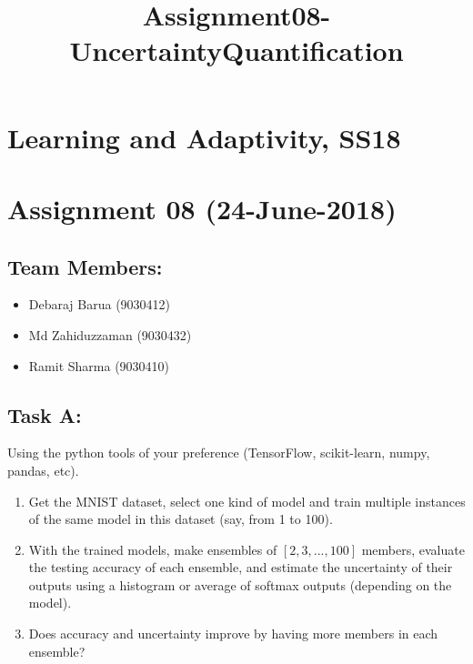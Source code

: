 \documentclass[11pt]{article}
\title{Assignment08-UncertaintyQuantification}
\providecommand{\tightlist}{%
      \setlength{\itemsep}{0pt}\setlength{\parskip}{0pt}}
\begin{document}
    
    
    \maketitle
    
    

    
    \section{Learning and Adaptivity,
SS18}\label{learning-and-adaptivity-ss18}

\section{Assignment 08 (24-June-2018)}\label{assignment-08-24-june-2018}

\subsection{Team Members:}\label{team-members}

\begin{itemize}
\tightlist
\item
  Debaraj Barua (9030412)
\item
  Md Zahiduzzaman (9030432)
\item
  Ramit Sharma (9030410)
\end{itemize}

    \subsection{Task A:}\label{task-a}

Using the python tools of your preference (TensorFlow, scikit-learn,
numpy, pandas, etc).

\begin{enumerate}
\def\labelenumi{\arabic{enumi}.}
\item
  Get the MNIST dataset, select one kind of model and train multiple
  instances of the same model in this dataset (say, from 1 to 100).
\item
  With the trained models, make ensembles of \([2, 3, ..., 100]\)
  members, evaluate the testing accuracy of each ensemble, and estimate
  the uncertainty of their outputs using a histogram or average of
  softmax outputs (depending on the model).
\item
  Does accuracy and uncertainty improve by having more members in each
  ensemble?
\end{enumerate}
\end{document}

